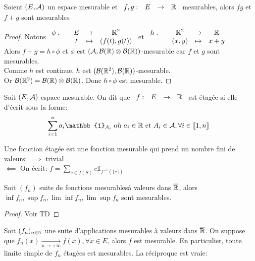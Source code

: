 \documentclass[]{report}
\begin{document}
    \begin{prop}{}{}
        Soient $(E,\mathcal{A})$ un espace mesurable et $\begin{array}{ccccc} f,g : & E & \to & \mathbb{R} \end{array}$ mesurables, alors $fg$ et $f+g$ sont mesurables
    \end{prop}

    \begin{proof}{}{}
        Notons $\begin{array}{ccccc} \phi : & & E & \to & \mathbb{R}^2 \\ & & t & \mapsto & (f(t),g(t)) \end{array}$ et $\begin{array}{ccccc} h : & & \mathbb{R}^2 & \to & \mathbb{R} \\ & & (x,y) & \mapsto & x+y \end{array}$\\
        Alors $f+g=h\circ\phi$ et $\phi$ est $(\mathcal{A},\mathcal{B}(\mathbb{R})\otimes\mathcal{B}(\mathbb{R}))$-mesurable car $f$ et $g$ sont mesurables.\\
        Comme $h$ est continue, $h$ est $(\mathcal{B}(\mathbb{R}^2),\mathcal{B}(\mathbb{R}))$-mesurable.\\
        Or $\mathcal{B}(\mathbb{R}^2)=\mathcal{B}(\mathbb{R})\otimes\mathcal{B}(\mathbb{R})$. Donc $h\circ \phi$ est mesurable.
    \end{proof}

    \begin{df}{}{}
        Soit $(E,\mathcal{A})$ espace mesurable. On dit que $\begin{array}{ccccc} f : & E & \to & \mathbb{R} \end{array}$ est étagée si elle d'écrit sous la forme:
        \[\sum_{i=1}^{n}a_i\mathbb{1}_{A_i}\text{ où }a_i\in\R\text{ et }A_i\in\Ar,\forall i \in\llbracket 1,n\rrbracket\]
    \end{df}

    \begin{re}{}{}
        Une fonction étagée est une fonction mesurable qui prend un nombre fini de valeurs:
        $\implies$ trivial\\
        $\impliedby$ On écrit: $f=\sum_{c\in f(S)}c\mathbb{1}_{f^{-1}(\{c\})}$
    \end{re}

    \begin{prop}{}{}
        Soit $(f_n)$ suite de fonctions mesurablesà valeurs dans $\overline{\mathbb{R}}$, alors $\inf f_n,\sup f_n,\lim \inf f_n,\lim \sup f_n$ sont mesurables.
    \end{prop}

    \begin{proof}{}{}
        Voir TD
    \end{proof}

    \begin{cor}{}{}
        Soit $(f_n)_{n\in\mathbb{N}}$ une suite d'applications mesurables à valeurs dans $\overline{\mathbb{R}}$. On suppose que $f_n(x)\underset{n\to +\infty}{\longrightarrow} f(x),\forall x\in E$, alors $f$ est mesurable. En particulier, toute limite simple de $f_n$ étagées est mesurables. La réciproque est vraie:
    \end{cor}
\end{document}
